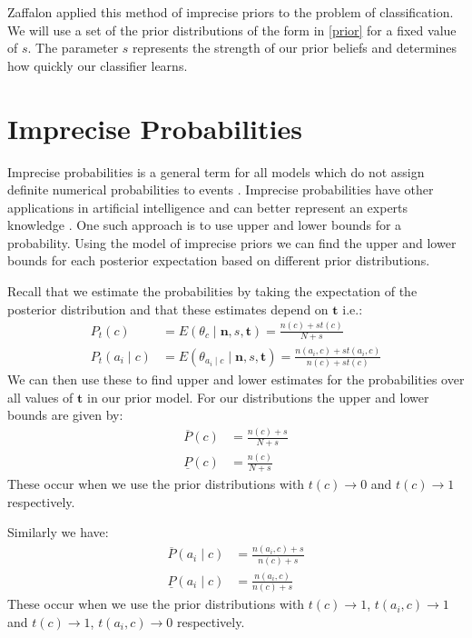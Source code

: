 Zaffalon applied this method of imprecise priors to the problem of classification.
We will use a set of the prior distributions of the form in \cref{prior} for a fixed value of $s$.
The parameter $s$ represents the strength of our prior beliefs and determines how quickly our classifier learns.

\section{Imprecise Probabilities}

Imprecise probabilities is a general term for all models which do not assign definite numerical probabilities to events \cite{Walley91}.
Imprecise probabilities have other applications in artificial intelligence and can better represent an experts knowledge \cite{}.
One such approach is to use upper and lower bounds for a probability.
Using the model of imprecise priors we can find the upper and lower bounds for each posterior expectation based on different prior distributions.

Recall that we estimate the probabilities by taking the expectation of the posterior distribution and that these estimates depend on $\mathbf{t}$ i.e.:
\begin{align}
	P_t(c) & = E(\theta_c \mid \mathbf{n},s,\mathbf{t}) = \frac{n(c) + st(c)}{N + s} \\
	P_t(a_i \mid c) & = E(\theta_{a_i \mid c} \mid \mathbf{n},s,\mathbf{t}) = \frac{n(a_i, c) + st(a_i, c)}{n(c) + st(c)}
\end{align}
We can then use these to find upper and lower estimates for the probabilities over all values of $\mathbf{t}$ in our prior model.
For our distributions the upper and lower bounds are given by:
\begin{align}
	\overline{P}(c) & = \frac{n(c) + s}{N+s} \\
	\underline{P}(c) & = \frac{n(c)}{N+s}
\end{align}
These occur when we use the prior distributions with $t(c) \rightarrow 0$ and $t(c) \rightarrow 1$ respectively.

Similarly we have:
\begin{align}
	\overline{P}(a_i \mid c) & = \frac{n(a_i, c) + s}{n(c)+s} \\
	\underline{P}(a_i \mid c) & = \frac{n(a_i, c)}{n(c)+s}
\end{align}
These occur when we use the prior distributions with $t(c) \rightarrow 1$, $t(a_i, c)\rightarrow1$ and $t(c) \rightarrow 1$, $t(a_i, c)\rightarrow0$ respectively.

